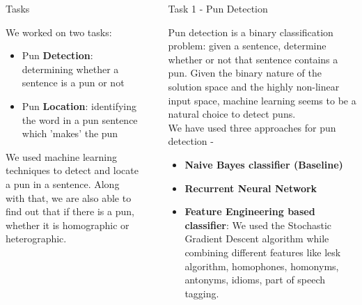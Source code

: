 \documentclass[final]{beamer}
\newlength{\sepwid}
\newlength{\onecolwid}
\newlength{\twocolwid}
\begin{document}
\begin{frame}[t]
\begin{columns}[t]
\begin{column}{\onecolwid}
		\begin{block}{Tasks}
			{\large
				We worked on two tasks: 
				\begin{itemize}
					\item {Pun \textbf{Detection}: determining whether a sentence is a pun or not}
					\item {Pun \textbf{Location}: identifying the word in a pun sentence which 'makes' the pun}
				\end{itemize}
				We used machine learning techniques to detect and locate a pun in a sentence. Along with that, we are also able to find out that if there is a pun, whether it is homographic or heterographic.\\
			}

		\end{block}

		\end{column}

\begin{column}{\sepwid}\end{column} %

\begin{column}{\twocolwid} %

\begin{columns}[t,totalwidth=\twocolwid] %

\begin{column}{\onecolwid}\vspace{-.6in} %

    \begin{block}{Task 1 - Pun Detection}
        {\large Pun detection is a binary classification problem: given a sentence, determine whether or not that sentence contains a pun. Given the binary nature of the solution space and the highly non-linear input space, machine learning seems to be a natural choice to detect puns.\\
        We have used three approaches for pun detection - 
        \begin{itemize}
          \item {\textbf{Naive Bayes classifier (Baseline)}}
          \item {\textbf{Recurrent Neural Network}}
           \item {\textbf{Feature Engineering based classifier}: We used the Stochastic Gradient Descent algorithm while combining different features like lesk algorithm, homophones, homonyms, antonyms, idioms, part of speech tagging.}
        \end{itemize}
        }
      \end{block}




\end{column}
\end{columns}
\end{column}
\end{columns}
\end{frame}
\end{document}
